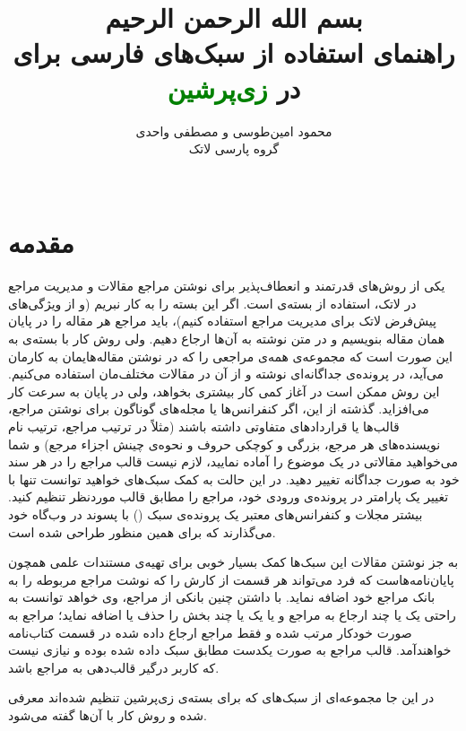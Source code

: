 \documentclass{article}
\title{\vspace{-2cm}
{\small بسم الله الرحمن الرحيم\\}
\vspace{2cm}
 راهنمای استفاده از سبک‌های فارسی  برای \textcolor{red}{\lr{\textsc{Bib}\TeX}}\\
 در \textcolor{green}{زی‌پرشین}}
\author{محمود امین‌طوسی و مصطفی واحدی\\
گروه پارسی لاتک\\
\lr{http://www.parsilatex.com}\\
\lr{\{m.amintoosi,mostafa.vahedi\} at gmail.com}
}
\theoremstyle{plain}\newtheorem{question}{پرسش}
\begin{document}
\maketitle
\vspace{2cm}
\tableofcontents

\section{مقدمه}

یکی از روش‌های قدرتمند و انعطاف‌پذیر برای نوشتن مراجع مقالات و مدیریت مراجع در لاتک، استفاده از بسته‌ی  است.
اگر این بسته را به کار نبریم (و از ویژگی‌های پیش‌فرض لاتک برای مدیریت مراجع استفاده کنیم)، باید مراجع هر مقاله را در پایان همان مقاله بنویسیم
و در متن نوشته به آن‌ها ارجاع دهیم. ولی روش کار با بسته‌ی  به این صورت است که مجموعه‌ی همه‌ی مراجعی را که در نوشتن مقاله‌هایمان به کارمان می‌آید، 
در پرونده‌ی جداگانه‌ای نوشته و از آن در مقالات مختلف‌مان استفاده می‌کنیم.  این روش ممکن است در آغاز کمی کار بیشتری بخواهد، ولی در پایان به سرعت کار می‌افزاید.
گذشته از این، اگر  کنفرانس‌ها یا مجله‌های گوناگون برای نوشتن مراجع، قالب‌ها یا قراردادهای متفاوتی داشته باشند
 (مثلاً در ترتیب مراجع، ترتیب نام نویسنده‌های هر مرجع، بزرگی و کوچکی حروف و نحوه‌ی چینش اجزاء مرجع) و شما می‌خواهید مقالاتی در یک موضوع را آماده نمایید،
 لازم نیست قالب مراجع را در هر سند خود به صورت جداگانه تغییر دهید. 
 در این حالت به کمک سبک‌های  خواهید توانست تنها با تغییر یک پارامتر در پرونده‌ی ورودی خود، مراجع را مطابق قالب موردنظر تنظیم کنید. 
 بیشتر مجلات و کنفرانس‌های معتبر یک پرونده‌ی سبک () با پسوند  در وب‌گاه خود می‌گذارند که برای همین منظور طراحی شده است.

به جز نوشتن مقالات این سبک‌ها کمک بسیار خوبی برای تهیه‌ی مستندات علمی همچون پایان‌نامه‌هاست که فرد می‌تواند هر قسمت از کارش را که نوشت مراجع مربوطه
را به بانک مراجع خود اضافه نماید. با داشتن چنین بانکی از مراجع، وی خواهد توانست به راحتی یک یا چند ارجاع به مراجع و یا یک یا چند بخش را حذف یا اضافه ‌نماید؛ 
مراجع به صورت خودکار مرتب شده و فقط مراجع ارجاع داده شده در قسمت کتاب‌نامه خواهندآمد. قالب مراجع به صورت یکدست مطابق سبک داده شده بوده و نیازی نیست
که کاربر درگیر قالب‌دهی به مراجع باشد. 

در این جا مجموعه‌ای از سبک‌های  که برای بسته‌ی زی‌پرشین تنظیم شده‌اند معرفی شده و روش کار با آن‌ها گفته می‌شود.
\end{document}
